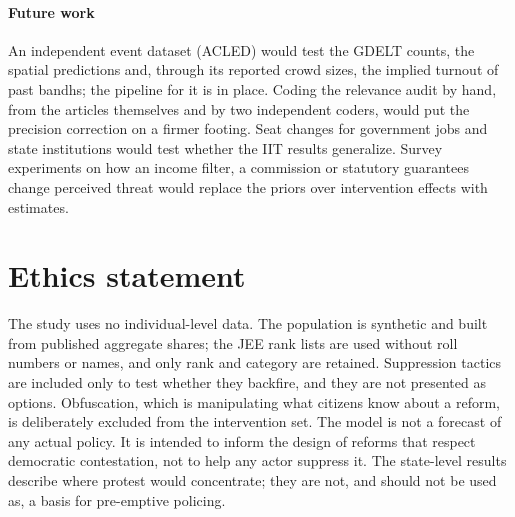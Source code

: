 \documentclass[11pt,a4paper]{article}
\begin{document}
\paragraph{Future work} An independent event dataset (ACLED) would test the GDELT counts, the spatial predictions and, through its reported crowd sizes, the implied turnout of past bandhs; the pipeline for it is in place. Coding the relevance audit by hand, from the articles themselves and by two independent coders, would put the precision correction on a firmer footing. Seat changes for government jobs and state institutions would test whether the IIT results generalize. Survey experiments on how an income filter, a commission or statutory guarantees change perceived threat would replace the priors over intervention effects with estimates.

\section{Ethics statement}
\label{sec:ethics}
The study uses no individual-level data. The population is synthetic and built from published aggregate shares; the JEE rank lists are used without roll numbers or names, and only rank and category are retained. Suppression tactics are included only to test whether they backfire, and they are not presented as options. Obfuscation, which is manipulating what citizens know about a reform, is deliberately excluded from the intervention set. The model is not a forecast of any actual policy. It is intended to inform the design of reforms that respect democratic contestation, not to help any actor suppress it. The state-level results describe where protest would concentrate; they are not, and should not be used as, a basis for pre-emptive policing.
\end{document}
